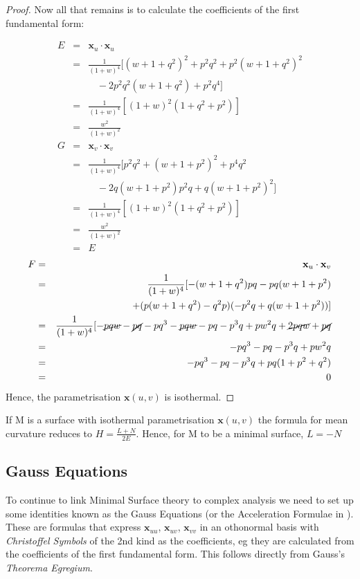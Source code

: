 \begin{proof}
Now all that remains is to calculate the coefficients of the first fundamental form:

\begin{eqnarray}
\nonumber
E &=& \mathbf x_u \cdot \mathbf x_u \\
\nonumber
&=& \frac{1}{(1+w)^4}[(w+1+q^2)^2 + p^2q^2 +p^2(w+1+q^2)^2 \\
\nonumber
&\ & \ \ \ \ -2p^2q^2(w+1+q^2)+p^2q^4]\\
\nonumber
&=& \frac{1}{(1+w)^4}[(1+w)^2(1+q^2+p^2)] \\
\nonumber
&=& \frac{w^2}{(1+w)^2} \\
\nonumber
G &=& \mathbf x_v \cdot \mathbf x_v \\
\nonumber
&=&\frac{1}{(1+w)^4}[p^2q^2+(w+1+p^2)^2+ p^4q^2 \\
\nonumber
&\ & \ \ \ \ -2q(w+1+p^2)p^2q+q(w+1+p^2)^2] \\
\nonumber
&=&\frac{1}{(1+w)^4}[(1+w)^2(1+q^2+p^2)] \\
\nonumber
&=&\frac{w^2}{(1+w)^2} \\
\nonumber
&=& E
\end{eqnarray}
\begin{eqnarray}
\nonumber
F &=& \mathbf x_u \cdot \mathbf x_v \\
\nonumber
&=&\frac{1}{(1+w)^4}[-(w+1+q^2)pq - pq(w+1+p^2) \\
\nonumber
&\ & \ \ \ \ + (p(w+1+q^2)-q^2p)(-p^2q+q(w+1+p^2))] \\
\nonumber
&=&\frac{1}{(1+w)^4}[-\cancel{pqw}-\cancel{pq}-pq^3-\cancel{pqw}-pq-p^3q+pw^2q+\cancel{2pqw}+\cancel{pq} \\
\nonumber
&=&-pq^3-pq-p^3q+pw^2q \\
\nonumber
&=&-pq^3-pq-p^3q+pq(1+p^2+q^2) \\
\nonumber
&=& 0
\end{eqnarray}   
Hence, the parametrisation $\mathbf x(u,v)$ is isothermal.
\end{proof}

\begin{cor}
If M is a surface with isothermal parametrisation $\mathbf x(u,v)$ the formula for mean curvature reduces to $H=\frac{L+N}{2E}$. Hence, for M to be a minimal surface, $L = -N$
\end{cor}

\subsection{Gauss Equations}
To continue to link Minimal Surface theory to complex analysis we need to set up some identities known as the Gauss Equations (or the Acceleration Formulae in \cite{OPR}). These are formulas that express $\mathbf x_{uu}$, $\mathbf x_{uv}$, $\mathbf x_{vv}$ in an othonormal basis with \emph{Christoffel Symbols} of the 2nd kind as the coefficients, eg they are calculated from the coefficients of the first fundamental form. This follows directly from Gauss's \emph{Theorema Egregium}.

